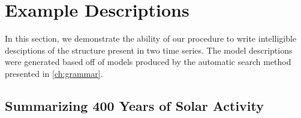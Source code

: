 






\section{Example Descriptions}
\label{sec:example-descriptions}
In this section, we demonstrate the ability of our procedure to write intelligible desciptions of the structure present in two time series.
The model descriptions were generated based off of models produced by the automatic search method presented in \cref{ch:grammar}.


\subsection{Summarizing 400 Years of Solar Activity}
\label{sec:solar}

